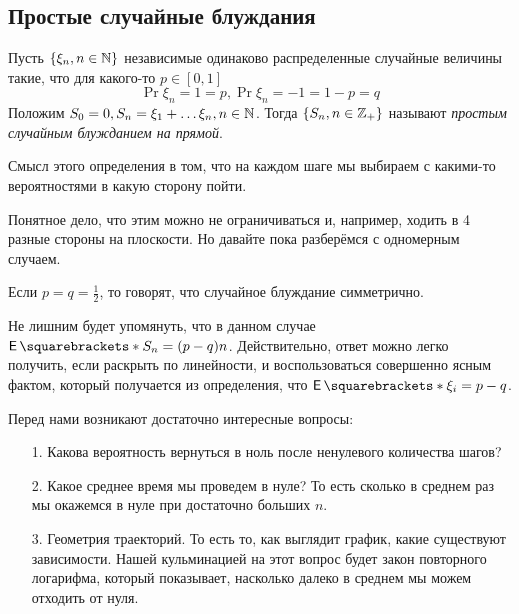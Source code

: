 \begin{example}
\begin{center}
\end{center}
\end{example}

\subsection{Простые случайные блуждания}

\begin{definition}
  Пусть $\{\xi_n, n \in \mathbb{N}\}$ независимые одинаково распределенные случайные
  величины такие, что для какого-то $p \in [0, 1]$
  \[
    \Pr{\xi_n = 1} = p, \Pr{\xi_n = -1} = 1 - p = q
  \]
  Положим $S_0 = 0, S_n = \xi_1 + \ldots \xi_n,
  n \in \mathbb{N}$. Тогда $\{S_n, n \in \mathbb{Z}_{+}\}$ называют \emph{простым случайным
  блужданием на прямой}.
\end{definition}

Смысл этого определения в том, что на каждом шаге мы выбираем с какими-то вероятностями в какую сторону пойти.

Понятное дело, что этим можно не ограничиваться и, например, ходить в 4 разные
стороны на плоскости. Но давайте пока разберёмся с одномерным случаем.

\begin{definition}
  Если $p = q = \frac{1}{2}$, то говорят, что случайное блуждание симметрично.
\end{definition}

\begin{remark}
  Не лишним будет упомянуть, что в данном случае $\E{S_n} = (p - q)n$. 
  Действительно, ответ можно легко получить, если раскрыть по линейности, и воспользоваться
  совершенно ясным фактом, который получается из определения, что $\E{\xi_i} = p - q$.
\end{remark}

Перед нами возникают достаточно интересные вопросы:

\begin{itemize}
  \item[1.] Какова вероятность вернуться в ноль после ненулевого количества шагов?
  \item[2.] Какое среднее время мы проведем в нуле? 
  То есть сколько в среднем раз мы окажемся в нуле при достаточно больших $n$.
  \item[3.] Геометрия траекторий. То есть то, как выглядит график, какие существуют зависимости.
  Нашей кульминацией на этот вопрос будет закон повторного логарифма, который показывает,
  насколько далеко в среднем мы можем отходить от нуля.
\end{itemize}

